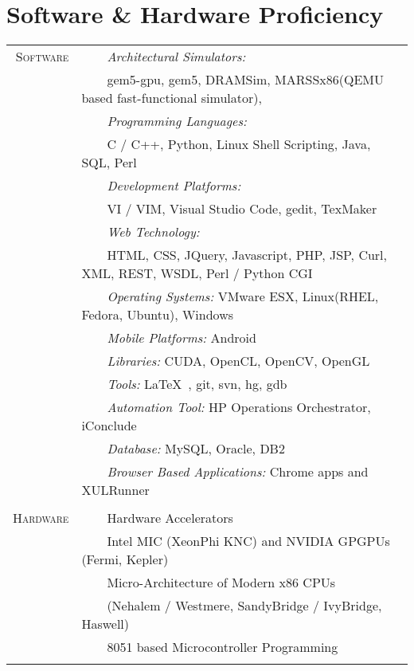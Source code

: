 \documentclass[a4paper,10pt]{article} %
\newcommand{\tabitem}{~~\llap{\textbullet}~~}
\begin{document}
\section{Software \& Hardware Proficiency}
\begin{tabular}{rl}
	\textsc{Software} & \tabitem \textit{Architectural Simulators:}\\
	& ~~~~gem5-gpu, gem5, DRAMSim, MARSSx86(QEMU based fast-functional simulator),\\
	& \tabitem \textit{Programming Languages:}\\
	& ~~~~C / C++, Python, Linux Shell Scripting, Java, SQL, Perl\\
	& \tabitem \textit{Development Platforms:} \\
	& ~~~~VI / VIM, Visual Studio Code, gedit, TexMaker\\
	& \tabitem \textit{Web Technology:} \\
	& ~~~~HTML, CSS, JQuery, Javascript, PHP, JSP, Curl, XML, REST, WSDL, Perl / Python CGI\\
	& \tabitem \textit{Operating Systems:} VMware ESX, Linux(RHEL, Fedora, Ubuntu), Windows \\
	& \tabitem \textit{Mobile Platforms:} Android \\
	& \tabitem \textit{Libraries:} CUDA, OpenCL, OpenCV, OpenGL  \\
	& \tabitem \textit{Tools:} \LaTeX\ , git, svn, hg, gdb\\
	& \tabitem \textit{Automation Tool:} HP Operations Orchestrator, iConclude \\
	& \tabitem \textit{Database:} MySQL, Oracle, DB2 \\
	& \tabitem \textit{Browser Based Applications:} Chrome apps and XULRunner \\

	&\\

	\textsc{Hardware}  & \tabitem Hardware Accelerators \\
	& ~~~~Intel MIC (XeonPhi KNC) and NVIDIA GPGPUs (Fermi, Kepler) \\
	& \tabitem Micro-Architecture of Modern x86 CPUs\\
	& ~~~~(Nehalem / Westmere, SandyBridge / IvyBridge, Haswell) \\
	& \tabitem 8051 based Microcontroller Programming \\
	&\\
\end{tabular}
\fi

\vspace{0.05in}
\end{document}
